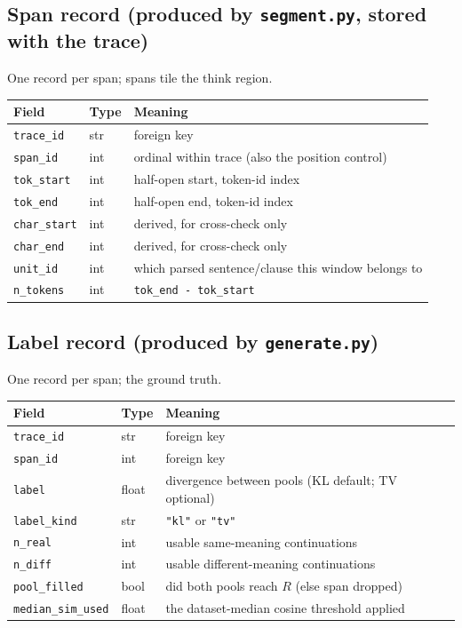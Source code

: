 \documentclass[11pt]{article}
\newcommand{\modu}[1]{\texttt{#1}}
\begin{document}
\subsection{Span record (produced by \modu{segment.py}, stored with the trace)}
One record per span; spans tile the think region.
\begin{center}
\begin{tabular}{@{}l l p{}@{}}
\toprule
\textbf{Field} & \textbf{Type} & \textbf{Meaning} \\
\midrule
\texttt{trace\_id}    & str    & foreign key \\
\texttt{span\_id}     & int    & ordinal within trace (also the position control) \\
\texttt{tok\_start}   & int    & half-open start, token-id index \\
\texttt{tok\_end}     & int    & half-open end, token-id index \\
\texttt{char\_start}  & int    & derived, for cross-check only \\
\texttt{char\_end}    & int    & derived, for cross-check only \\
\texttt{unit\_id}     & int    & which parsed sentence/clause this window belongs to \\
\texttt{n\_tokens}    & int    & \texttt{tok\_end - tok\_start} \\
\bottomrule
\end{tabular}
\end{center}

\subsection{Label record (produced by \modu{generate.py})}
One record per span; the ground truth.
\begin{center}
\begin{tabular}{@{}l l p{}@{}}
\toprule
\textbf{Field} & \textbf{Type} & \textbf{Meaning} \\
\midrule
\texttt{trace\_id}        & str    & foreign key \\
\texttt{span\_id}         & int    & foreign key \\
\texttt{label}            & float  & divergence between pools (KL default; TV optional) \\
\texttt{label\_kind}      & str    & \texttt{"kl"} or \texttt{"tv"} \\
\texttt{n\_real}          & int    & usable same-meaning continuations \\
\texttt{n\_diff}          & int    & usable different-meaning continuations \\
\texttt{pool\_filled}     & bool   & did both pools reach $R$ (else span dropped) \\
\texttt{median\_sim\_used}& float  & the dataset-median cosine threshold applied \\
\bottomrule
\end{tabular}
\end{center}
\end{document}
